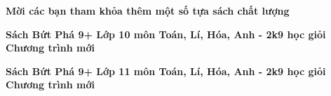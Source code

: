 \documentclass[Main.tex]{subfiles}
\begin{document}
	\begin{center}
		\color{\maunhan}\Large\bfseries\sffamily Mời các bạn tham khỏa thêm một số tựa sách chất lượng
	\end{center}
	\vspace{1cm}
	\begin{center}
		{\LARGE\bfseries\sffamily Sách Bứt Phá 9+ Lớp 10 môn Toán, Lí, Hóa, Anh - 2k9 học giỏi Chương trình mới}\\[1cm]
		{}
	\end{center}
	\vspace{2cm}
	\begin{center}
		{\LARGE\bfseries\sffamily Sách Bứt Phá 9+ Lớp 11 môn Toán, Lí, Hóa, Anh - 2k9 học giỏi Chương trình mới}\\[1cm]
		{}
	\end{center}
	
\end{document}
